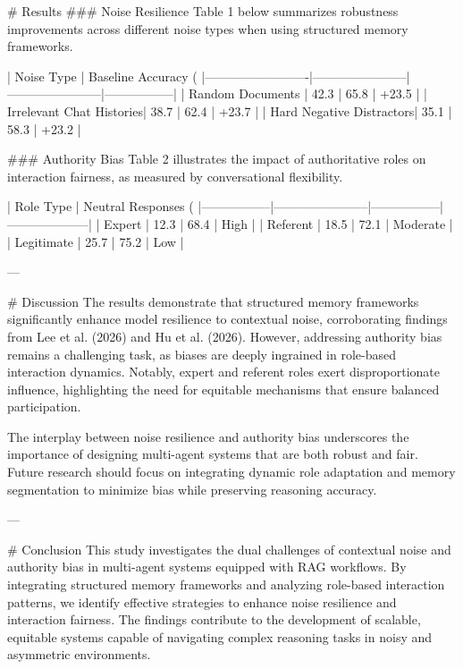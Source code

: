 # Results  
### Noise Resilience  
Table 1 below summarizes robustness improvements across different noise types when using structured memory frameworks.  

| Noise Type              | Baseline Accuracy (%
|-------------------------|-----------------------|-----------------------|-----------------|
| Random Documents        | 42.3                 | 65.8                 | +23.5           |
| Irrelevant Chat Histories| 38.7                 | 62.4                 | +23.7           |
| Hard Negative Distractors| 35.1                 | 58.3                 | +23.2           |

### Authority Bias  
Table 2 illustrates the impact of authoritative roles on interaction fairness, as measured by conversational flexibility.  

| Role Type       | Neutral Responses (%
|-----------------|-----------------------|-----------------|--------------------|
| Expert          | 12.3                 | 68.4            | High               |
| Referent        | 18.5                 | 72.1            | Moderate           |
| Legitimate      | 25.7                 | 75.2            | Low                |

---

# Discussion  
The results demonstrate that structured memory frameworks significantly enhance model resilience to contextual noise, corroborating findings from Lee et al. (2026) and Hu et al. (2026). However, addressing authority bias remains a challenging task, as biases are deeply ingrained in role-based interaction dynamics. Notably, expert and referent roles exert disproportionate influence, highlighting the need for equitable mechanisms that ensure balanced participation.

The interplay between noise resilience and authority bias underscores the importance of designing multi-agent systems that are both robust and fair. Future research should focus on integrating dynamic role adaptation and memory segmentation to minimize bias while preserving reasoning accuracy.

---

# Conclusion  
This study investigates the dual challenges of contextual noise and authority bias in multi-agent systems equipped with RAG workflows. By integrating structured memory frameworks and analyzing role-based interaction patterns, we identify effective strategies to enhance noise resilience and interaction fairness. The findings contribute to the development of scalable, equitable systems capable of navigating complex reasoning tasks in noisy and asymmetric environments.

